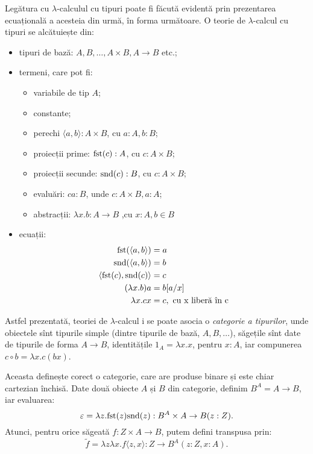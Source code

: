 \documentclass[a4paper]{article}
\begin{document}
Legătura cu $ \lambda $-calculul cu tipuri poate fi făcută evidentă prin
prezentarea ecuațională a acesteia din urmă, în forma următoare. O
teorie de $\lambda$-calcul cu tipuri se alcătuiește din:
\begin{itemize}
  \item tipuri de bază: $ A, B, \dots, A \times B, A \to B $ etc.;
  \item termeni, care pot fi:
    \begin{itemize}
      \item variabile de tip $ A $;
      \item constante;
      \item perechi $ \langle a, b \rangle : A \times B $, cu $ a : A, b : B $;
      \item proiecții prime: $ \mathrm{fst}(c) : A$, cu $ c : A \times B $;
      \item proiecții secunde: $ \mathrm{snd}(c) : B$, cu $ c : A \times B $;
      \item evaluări: $ca : B$, unde $ c : A \times B, a : A $;
      \item abstracții: $ \lambda x . b : A \to B$ ,cu $ x : A, b \in B $
    \end{itemize}
    \item ecuații:
      \begin{align*}
        \mathrm{fst}(\langle a, b \rangle) &= a \\
        \mathrm{snd}(\langle a, b \rangle) &= b \\
        \langle \mathrm{fst}(c), \mathrm{snd}(c)\rangle &= c \\
        (\lambda x . b) a &= b[a/x] \\
        \lambda x . cx &= c, \text{ cu x liberă în c}
      \end{align*}
\end{itemize}


Astfel prezentată, teoriei de $ \lambda $-calcul i se poate asocia
o \emph{categorie a tipurilor}, unde obiectele sînt tipurile simple
(dintre tipurile de bază, $ A, B, \dots $), săgețile sînt date de
tipurile de forma $ A \to B $, identitățile $ 1_A = \lambda x. x$,
pentru $ x : A $, iar compunerea $ c \circ b = \lambda x.c(bx) $.

Aceasta definește corect o categorie, care are produse binare și
este chiar cartezian închisă. Date două obiecte $ A $ și $ B $
din categorie, definim $ B^A = A \to B $, iar evaluarea:
\[
  \varepsilon = \lambda z . \mathrm{fst}(z)\mathrm{snd}(z) : B^A \times A \to B (z : Z).
\]
Atunci, pentru orice săgeată $ f : Z \times A \to B $, putem defini
transpusa prin:
\[
  \widetilde{f} = \lambda z \lambda x . f\langle z, x \rangle : %
  Z \to B^A (z : Z, x : A).
\]
\end{document}
